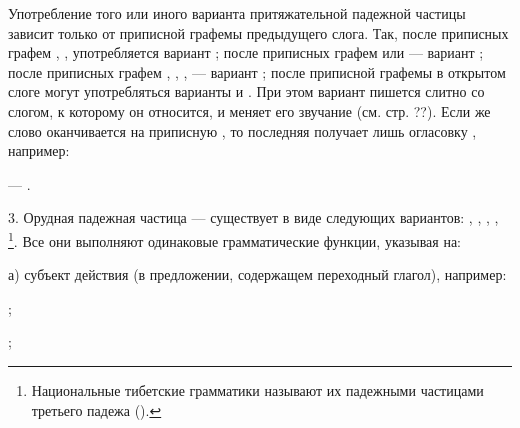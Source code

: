 Употребление того или иного варианта притяжательной падежной частицы зависит только от приписной графемы предыдущего слога. Так, после приписных графем , ,  употребляется вариант ; после приписных графем  или  --- вариант ; после приписных графем , , ,  --- вариант ; после приписной графемы	 в открытом слоге могут употребляться варианты  и . При этом вариант  пишется слитно со слогом, к которому он относится, и меняет его звучание (см. стр. ??). Если же слово оканчивается на приписную , то последняя получает лишь огласовку , например:
\begin{prfsample}
	\item {} --- .
\end{prfsample}

3. Орудная падежная частица --- существует в виде следующих вариантов:
, , , , \footnote[47]{Национальные тибетские грамматики называют их падежными частицами третьего падежа ().}.
Все они выполняют одинаковые грамматические функции, указывая на:

а) субъект действия (в предложении, содержащем переходный глагол), например:
\begin{prfsample}
	\item {};
	\item {};
\end{prfsample}

